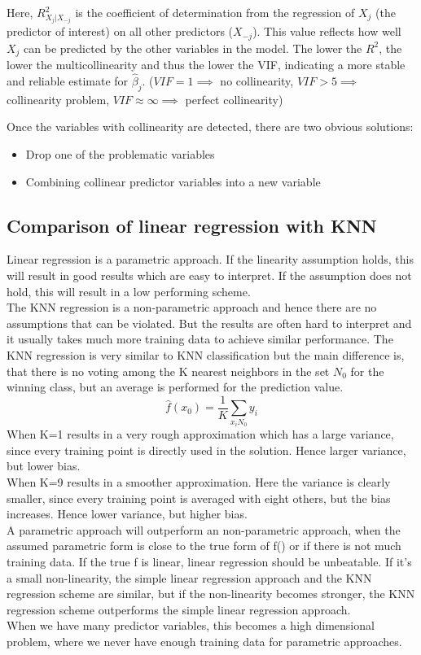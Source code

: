 \documentclass[../document.tex]{subfiles}
\begin{document}
	Here, \( R^2_{X_{j}|X_{-j}} \) is the coefficient of determination from the regression of \( X_j \) (the predictor of interest) on all other predictors (\(X_{-j}\)). This value reflects how well \( X_j \) can be predicted by the other variables in the model. The lower the \( R^2 \), the lower the multicollinearity and thus the lower the VIF, indicating a more stable and reliable estimate for \(\hat{\beta}_{j}\). ($VIF=1\implies$ no collinearity, $VIF>5\implies$ collinearity problem, $VIF\approx\infty \implies$ perfect collinearity)

	Once the variables with collinearity are detected, there are two obvious solutions:
	\begin{itemize}
		\item Drop one of the problematic variables
		\item Combining collinear predictor variables into a new variable
	\end{itemize}

	\subsection{Comparison of linear regression with KNN}
	Linear regression is a parametric approach. If the linearity assumption holds, this will result in good results which are easy to interpret. If the assumption does not hold, this will result in a low performing scheme.\\
	The KNN regression is a non-parametric approach and hence there are no assumptions that can be violated. But the results are often hard to interpret and it usually takes much more training data to achieve similar performance. The KNN regression is very similar to KNN classification but the main difference is, that there is no voting among the K nearest neighbors in the set \(N_{0}\) for the winning class, but an average is performed for the prediction value.
	\begin{equation}
		\hat{f}(x_{0})=\frac{1}{K}\sum_{x_{i}N_{0}}y_{i}
	\end{equation}
	When K=1 results in a very rough approximation which has a large variance, since every training point is directly used in the solution. Hence larger variance, but lower bias.\\
	When K=9 results in a smoother approximation. Here the variance is clearly smaller, since every training point is averaged with eight others, but the bias increases. Hence lower variance, but higher bias.\\
	A parametric approach will outperform an non-parametric approach, when the assumed parametric form is close to the true form of f() or if there is not much training data. If the true f is linear, linear regression should be unbeatable. If it's a small non-linearity, the simple linear regression approach and the KNN regression scheme are similar, but if the non-linearity becomes stronger, the KNN regression scheme outperforms the simple linear regression approach.\\
	When we have many predictor variables, this becomes a high dimensional problem, where we never have enough training data for parametric approaches.
\end{document}
